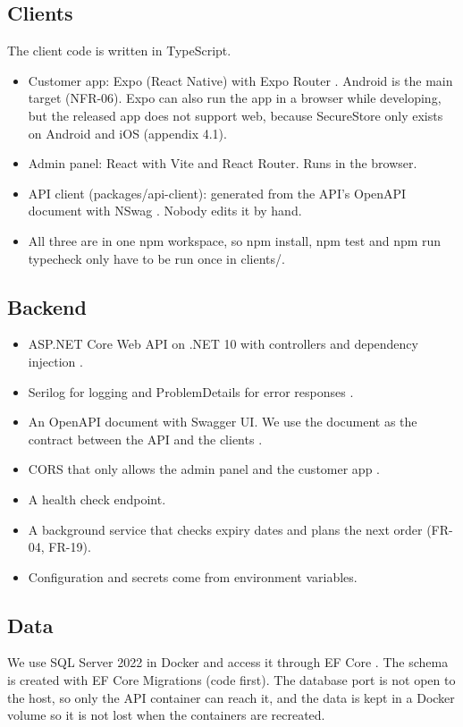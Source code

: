 \documentclass[a4paper,11pt]{article}
\begin{document}
\subsection{Clients}
The client code is written in TypeScript.
\begin{itemize}
    \item Customer app: Expo (React Native) with Expo Router \cite{expo-router-introduction}. Android is the main target (NFR-06). Expo can also run the app in a browser while developing, but the released app does not support web, because SecureStore only exists on Android and iOS (appendix 4.1).
    \item Admin panel: React with Vite and React Router. Runs in the browser.
    \item API client (packages/api-client): generated from the API's OpenAPI document with NSwag \cite{nswag-typescript-client-generator}. Nobody edits it by hand.
    \item All three are in one npm workspace, so npm install, npm test and npm run typecheck only have to be run once in clients/.
\end{itemize}

\subsection{Backend}
\begin{itemize}
    \item ASP.NET Core Web API on .NET 10 with controllers and dependency injection \cite[sec.~1.2.1]{desanctis-web-apis-aspnet-core}.
    \item Serilog for logging and ProblemDetails for error responses \cite[secs.~6.2.4 and 7.4.1]{desanctis-web-apis-aspnet-core}.
    \item An OpenAPI document with Swagger UI. We use the document as the contract between the API and the clients \cite[sec.~3.2.1]{desanctis-web-apis-aspnet-core}.
    \item CORS that only allows the admin panel and the customer app \cite[sec.~3.1.1]{desanctis-web-apis-aspnet-core}.
    \item A health check endpoint.
    \item A background service that checks expiry dates and plans the next order (FR-04, FR-19).
    \item Configuration and secrets come from environment variables.
\end{itemize}

\subsection{Data}
We use SQL Server 2022 in Docker and access it through EF Core \cite[sec.~4.2.2]{desanctis-web-apis-aspnet-core}. The schema is created with EF Core Migrations (code first). The database port is not open to the host, so only the API container can reach it, and the data is kept in a Docker volume so it is not lost when the containers are recreated.
\end{document}

